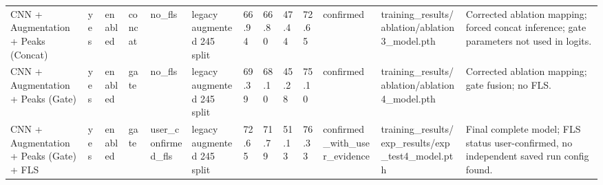 \begin{table}
\begin{tabular}{lllllllllllll}
CNN + Augmentation + Peaks (Concat) & yes & enabled & concat & no\_fls & legacy augmented 245 split & 66.94 & 66.80 & 47.44 & 72.65 & confirmed & training\_results/ablation/ablation3\_model.pth & Corrected ablation mapping; forced concat inference; gate parameters not used in logits. \\
CNN + Augmentation + Peaks (Gate) & yes & enabled & gate & no\_fls & legacy augmented 245 split & 69.39 & 68.10 & 45.28 & 75.10 & confirmed & training\_results/ablation/ablation4\_model.pth & Corrected ablation mapping; gate fusion; no FLS. \\
CNN + Augmentation + Peaks (Gate) + FLS & yes & enabled & gate & user\_confirmed\_fls & legacy augmented 245 split & 72.65 & 71.79 & 51.13 & 76.33 & confirmed\_with\_user\_evidence & training\_results/exp\_results/exp\_test4\_model.pth & Final complete model; FLS status user-confirmed, no independent saved run config found. \\
\bottomrule
\end{tabular}
\end{table}
